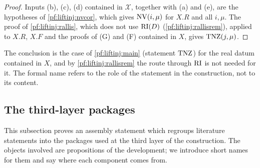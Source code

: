 \begin{proof}
Inputs (b), (c), (d) contained in $\mathcal X$, together with (a) and (e), are the hypotheses of \cref{pf:liftinj:nvcor}, which gives
$\mathrm{NV}(i,\mu)$ for $X.R$ and all $i,\mu$. The proof of \cref{pf:liftinj:rallis}, which does not use $\mathrm{RI}(D)$ (\cref{pf:liftinj:rallisrem}),
applied to $X.R$, $X.F$ and the proofs of (G) and (F) contained in $X$, gives $\mathrm{TNZ}(j,\mu)$.
\end{proof}

\begin{remark}\label{pf:liftinj:realrem}
The conclusion is the case of \cref{pf:liftinj:main} (statement $\mathrm{TNZ}$) for the real datum contained in $X$, and by \cref{pf:liftinj:rallisrem} the
route through $\mathrm{RI}$ is not needed for it. The formal name refers to the role of the statement in the construction, not to its content.
\end{remark}

\subsection{The third-layer packages}\label{sec:pf:liftinj:C}

This subsection proves an assembly statement which regroups literature statements into the packages used at the third layer of the construction.
The objects involved are propositions of the development; we introduce short names for them and say where each component comes from.

